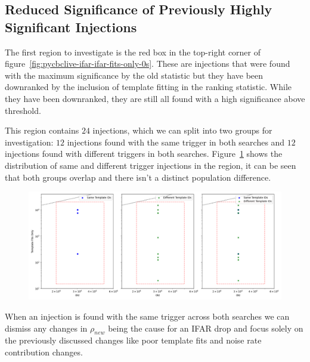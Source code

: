 \subsection{\label{sec:pycbclive-top-right}Reduced Significance of Previously Highly Significant Injections}

The first region to investigate is the red box in the top-right corner of figure~\ref{fig:pycbclive-ifar-ifar-fits-only-0s}. These are injections that were found with the maximum significance by the old statistic but they have been downranked by the inclusion of template fitting in the ranking statistic. While they have been downranked, they are still all found with a high significance above threshold. 

This region contains $24$ injections, which we can split into two groups for investigation: $12$ injections found with the same trigger in both searches and $12$ injections found with different triggers in both searches. Figure~\ref{fig:pycbclive-top-right-region} shows the distribution of same and different trigger injections in the region, it can be seen that both groups overlap and there isn't a distinct population difference.
%
\begin{figure}
       \centering
    \includegraphics[width=1\textwidth]{images/pycbclive/ifar_vs_ifar_subplots.png}
    \caption{}
    \label{fig:pycbclive-top-right-region}
\end{figure}
%
When an injection is found with the same trigger across both searches we can dismiss any changes in $\rho_{new}$ being the cause for an IFAR drop and focus solely on the previously discussed changes like poor template fits and noise rate contribution changes.

